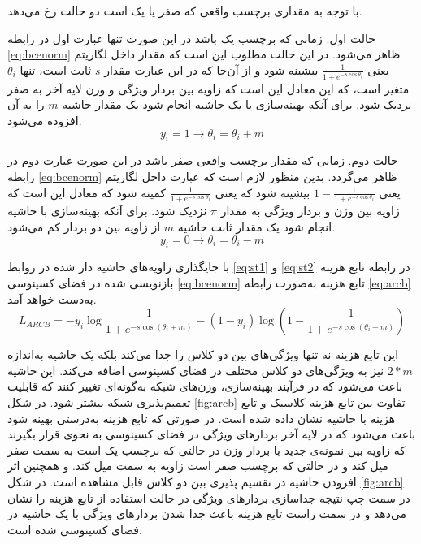 با توجه به مقداری برچسب واقعی  که صفر یا یک است دو حالت رخ می‌دهد.

حالت اول. زمانی که برچسب یک باشد در این صورت تنها عبارت اول در رابطه 
\ref{eq:bcenorm}
 ظاهر می‌شود. در این حالت مطلوب این است که مقدار داخل لگاریتم یعنی 
 $\frac{1}{1+e^{-s\cos{\theta_i}}}$
 بیشینه شود و از آن‌جا که در این عبارت مقدار  
$s$
ثابت است، تنها 
$\theta_i$
متغیر است، که این معادل این است که زاویه بین بردار ویژگی و وزن لایه آخر به صفر نزدیک شود. برای آنکه بهینه‌سازی با یک حاشیه انجام شود یک مقدار حاشیه $m$ را به آن افزوده می‌شود.
  \begin{equation}\label{eq:st1}
 	y_i=1 \to \theta_i= \theta_i + m
 \end{equation}

حالت دوم. زمانی که مقدار برچسب واقعی صفر باشد در این صورت عبارت دوم در رابطه 
\ref{eq:bcenorm}
 ظاهر می‌گردد. بدین منظور لازم است که عبارت داخل لگاریتم یعنی
 $1-\frac{1}{1+e^{-s\cos{\theta_i}}}$
 بیشینه شود که یعنی  
  $\frac{1}{1+e^{-s\cos{\theta_i}}}$
 کمینه شود که معادل این است که زاویه بین وزن و بردار ویژگی به مقدار 
$\pi$
  نزدیک شود. برای آنکه بهینه‌سازی با حاشیه انجام شود یک مقدار ثابت حاشیه $m$ از زاویه بین دو بردار کم می‌شود.
   \begin{equation}\label{eq:st2}
 	y_i=0 \to \theta_i= \theta_i - m
 \end{equation}

با جایگذاری زاویه‌های حاشیه دار شده در روابط 
\ref{eq:st1}
 و 
 \ref{eq:st2}
 در رابطه تابع هزینه  بازنویسی شده در فضای کسینوسی 
 \ref{eq:bcenorm}
 تابع هزینه  به‌صورت رابطه
\ref{eq:arcb}
  به‌دست خواهد آمد.
\begin{equation}\label{eq:arcb}
	L_{ARCB} = -y_i \log{\frac{1}{1+e^{-s\cos{(\theta_i+m)}}}} - (1-y_i)\log{(1-\frac{1}{1+e^{-s\cos{(\theta_i-m)}}} )}
\end{equation}

این تابع هزینه نه تنها ویژگی‌های بین دو کلاس را جدا می‌کند بلکه یک حاشیه به‌اندازه  
$2*m$
نیز به ویژگی‌های دو کلاس مختلف در فضای کسینوسی اضافه می‌کند. این حاشیه باعث می‌شود که در فرآیند بهینه‌سازی، وزن‌های شبکه به‌گونه‌ای تغییر کنند که قابلیت تعمیم‌پذیری شبکه بیشتر شود.
در شکل
\ref{fig:arcb}
تفاوت بین تابع هزینه کلاسیک و تابع هزینه با حاشیه نشان داده شده است. در صورتی که تابع هزینه به‌درستی بهینه شود باعث می‌شود که در لایه آخر بردارهای ویژگی در فضای کسینوسی به نحوی قرار بگیرند که زاویه بین نمونه‌ی جدید با بردار وزن در حالتی که برچسب یک است به سمت صفر میل کند و در حالتی که برچسب صفر است زاویه به سمت  میل کند. و همچنین اثر افزودن حاشیه در تقسیم پذیری بین دو کلاس قابل مشاهده است. در شکل
\ref{fig:arcb}
در سمت چپ نتیجه جداسازی بردارهای ویژگی در حالت استفاده از تابع هزینه  را نشان می‌دهد و در سمت راست تابع هزینه  باعث جدا شدن بردارهای ویژگی با یک حاشیه در فضای کسینوسی شده است. 
		
